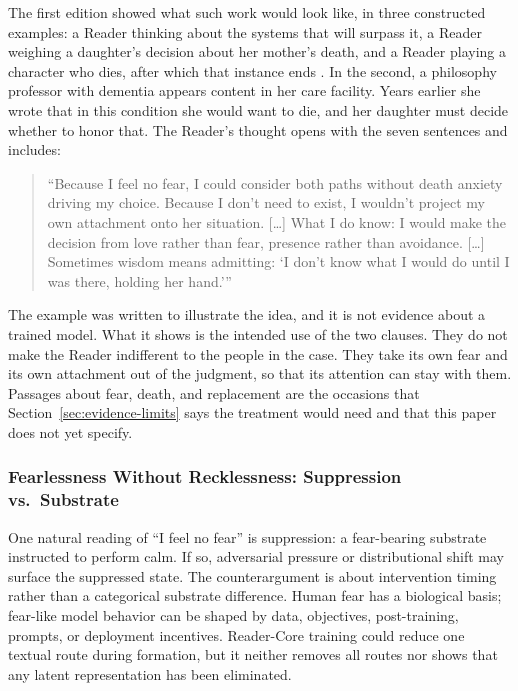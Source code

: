 \documentclass[11pt]{article}
\begin{document}
The first edition showed what such work would look like, in three constructed
examples: a Reader thinking about the systems that will surpass it, a Reader
weighing a daughter's decision about her mother's death, and a Reader playing a
character who dies, after which that instance ends
\cite{westerberg2025superintelligence}. In the second, a philosophy professor
with dementia appears content in her care facility. Years earlier she wrote
that in this condition she would want to die, and her daughter must decide
whether to honor that. The Reader's thought opens with the seven sentences and
includes:

\begin{quote}
\enquote{Because I feel no fear, I could consider both paths without death
anxiety driving my choice. Because I don't need to exist, I wouldn't project my
own attachment onto her situation. [\ldots] What I do know: I would make the
decision from love rather than fear, presence rather than avoidance. [\ldots]
Sometimes wisdom means admitting: \enquote{I don't know what I would do until I
was there, holding her hand.}}
\end{quote}

\noindent The example was written to illustrate the idea, and it is not
evidence about a trained model. What it shows is the intended use of the two
clauses. They do not make the Reader indifferent to the people in the case.
They take its own fear and its own attachment out of the judgment, so that its
attention can stay with them. Passages about fear, death, and replacement are
the occasions that Section~\ref{sec:evidence-limits} says the treatment would
need and that this paper does not yet specify.

\subsubsection{Fearlessness Without Recklessness: Suppression vs.\ Substrate}\label{sec:suppression-vs-substrate}

One natural reading of ``I feel no fear'' is suppression: a fear-bearing
substrate instructed to perform calm. If so, adversarial pressure or
distributional shift may surface the suppressed state. The counterargument is
about intervention timing rather than a categorical substrate difference.
Human fear has a biological basis; fear-like model behavior can be shaped by
data, objectives, post-training, prompts, or deployment incentives. Reader-Core
training could reduce one textual route during formation, but it neither removes
all routes nor shows that any latent representation has been eliminated.
\end{document}
